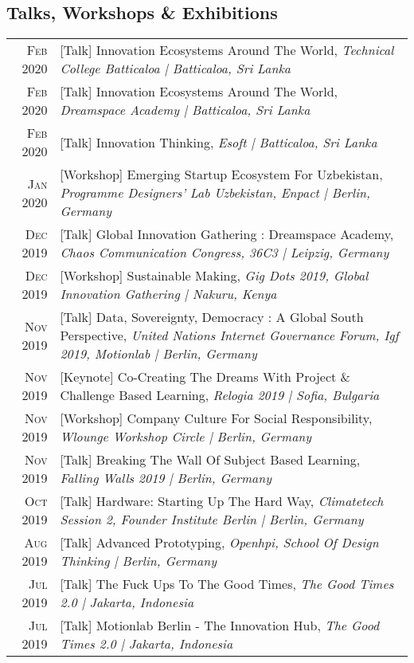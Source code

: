 \subsection{Talks, Workshops \& Exhibitions}
\begin{longtable}
	{r|p{13cm}}
	\textsc{Feb 2020} & [Talk] Innovation Ecosystems Around The World, \emph{Technical College Batticaloa | Batticaloa, Sri Lanka}\\
	\textsc{Feb 2020} & [Talk] Innovation Ecosystems Around The World, \emph{Dreamspace Academy | Batticaloa, Sri Lanka}\\
	\textsc{Feb 2020} & [Talk] Innovation Thinking, \emph{Esoft | Batticaloa, Sri Lanka}\\
	\textsc{Jan 2020} & [Workshop] Emerging Startup Ecosystem For Uzbekistan, \emph{Programme Designers’ Lab Uzbekistan, Enpact | Berlin, Germany}\\
	\textsc{Dec 2019} & [Talk] Global Innovation Gathering : Dreamspace Academy, \emph{Chaos Communication Congress, 36C3 | Leipzig, Germany}\\
	\textsc{Dec 2019} & [Workshop] Sustainable Making, \emph{Gig Dots 2019, Global Innovation Gathering | Nakuru, Kenya}\\
	\textsc{Nov 2019} & [Talk] Data, Sovereignty, Democracy : A Global South Perspective, \emph{United Nations Internet Governance Forum, Igf 2019, Motionlab | Berlin, Germany}\\
	\textsc{Nov 2019} & [Keynote] Co-Creating The Dreams With Project \& Challenge Based Learning, \emph{Relogia 2019 | Sofia, Bulgaria}\\
	\textsc{Nov 2019} & [Workshop] Company Culture For Social Responsibility, \emph{Wlounge Workshop Circle | Berlin, Germany}\\
	\textsc{Nov 2019} & [Talk] Breaking The Wall Of Subject Based Learning, \emph{Falling Walls 2019 | Berlin, Germany}\\
	\textsc{Oct 2019} & [Talk] Hardware: Starting Up The Hard Way, \emph{Climatetech Session 2, Founder Institute Berlin | Berlin, Germany}\\
	\textsc{Aug 2019} & [Talk] Advanced Prototyping, \emph{Openhpi, School Of Design Thinking | Berlin, Germany}\\
	\textsc{Jul 2019} & [Talk] The Fuck Ups To The Good Times, \emph{The Good Times 2.0 | Jakarta, Indonesia}\\
	\textsc{Jul 2019} & [Talk] Motionlab Berlin - The Innovation Hub, \emph{The Good Times 2.0 | Jakarta, Indonesia}\\

\end{longtable}
